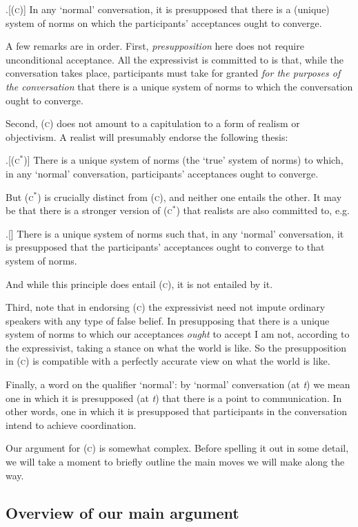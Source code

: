 \documentclass[11pt,article,oneside]{memoir}
\begin{document}
\ex.[(\textsc{c})] In any `normal' conversation, it is presupposed that there is a (unique) system of norms on which the participants' acceptances ought to converge.

A few remarks are in order. First, \emph{presupposition} here does not require unconditional acceptance. All the expressivist is committed to is that, while the conversation takes place, participants must take for granted \emph{for the purposes of the conversation} that there is a unique system of norms to which the conversation ought to converge. 

Second, (\textsc{c}) does not amount to a capitulation to a form of realism or objectivism. A realist will presumably endorse the following thesis: 

\ex.[(\textsc{c$^*$})] There is a unique system of norms (the `true' system of norms) to which, in any `normal' conversation, participants' acceptances ought to converge. 

But (\textsc{c$^*$}) is crucially distinct from (\textsc{c}), and neither one entails the other. It may be that there is a stronger version of (\textsc{c$^*$}) that realists are also committed to, e.g.

\ex.[] There is a unique system of norms such that, in any `normal' conversation, it is presupposed that the participants' acceptances ought to converge to that system of norms. 

And while this principle does entail (\textsc{c}), it is not entailed by it. 

Third, note that in endorsing (\textsc{c}) the expressivist need not impute ordinary speakers with any type of false belief. In presupposing that there is a unique system of norms to which our acceptances \emph{ought} to accept I am not, according to the expressivist, taking a stance on what the world is like. So the presupposition in (\textsc{c}) is compatible with a perfectly accurate view on what the world is like. 

Finally, a word on the qualifier `normal': by `normal' conversation (at \emph{t}) we mean one in which it is presupposed (at \emph{t}) that there is a point to communication. In other words, one in which it is presupposed that participants in the conversation intend to achieve coordination.

Our argument for (\textsc{c}) is somewhat complex. Before spelling it out in some detail, we will take a moment to briefly outline the main moves we will make along the way. 

\subsection{Overview of our main argument}
\end{document}
